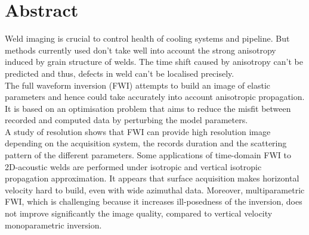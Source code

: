 \section*{Abstract}

Weld imaging is crucial to control health of cooling systems and pipeline. But methods currently used don't take well into account the strong anisotropy induced by grain structure of welds. The time shift caused by anisotropy can't be predicted and thus, defects in weld can't be localised precisely. \\

The full waveform inversion (FWI) attempts to build an image of elastic parameters and hence could take accurately into account anisotropic propagation. It is based on an optimisation problem that aims to reduce the misfit between recorded and computed data by perturbing the model parameters. \\

A study of resolution shows that FWI can provide high resolution image depending on the acquisition system, the records duration and the scattering pattern of the different parameters. Some applications of time-domain FWI to 2D-acoustic welds are performed under isotropic and vertical isotropic propagation approximation. It appears that surface acquisition makes horizontal velocity hard to build, even with wide azimuthal data. Moreover, multiparametric FWI, which is challenging because it increases ill-posedness of the inversion, does not improve significantly the image quality, compared to vertical velocity monoparametric inversion.


